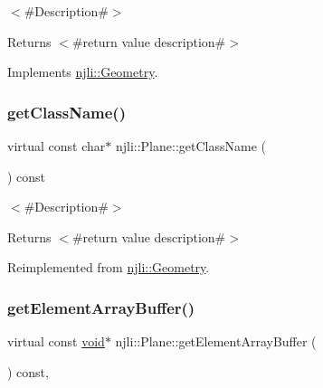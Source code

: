 $<$\#\+Description\#$>$

\begin{DoxyReturn}{Returns}
$<$\#return value description\#$>$ 
\end{DoxyReturn}


Implements \mbox{\hyperlink{classnjli_1_1_geometry_a97ec03852997043d6900af8009b390d9}{njli\+::\+Geometry}}.

\mbox{\label{classnjli_1_1_plane_a9a7ccbc86c1f486cd816f0f4f3e9c550}} 
\subsubsection{\texorpdfstring{get\+Class\+Name()}{getClassName()}}
{\footnotesize\ttfamily virtual const char$\ast$ njli\+::\+Plane\+::get\+Class\+Name (\begin{DoxyParamCaption}{ }\end{DoxyParamCaption}) const\hspace{0.3cm}{\ttfamily [virtual]}}

$<$\#\+Description\#$>$

\begin{DoxyReturn}{Returns}
$<$\#return value description\#$>$ 
\end{DoxyReturn}


Reimplemented from \mbox{\hyperlink{classnjli_1_1_geometry_abfa3fe3b5680b7b40c650fdc7a7fb737}{njli\+::\+Geometry}}.

\mbox{\label{classnjli_1_1_plane_a13ae025d91ca2ef639d1ba4e92b5ccc5}} 
\subsubsection{\texorpdfstring{get\+Element\+Array\+Buffer()}{getElementArrayBuffer()}}
{\footnotesize\ttfamily virtual const \mbox{\hyperlink{_thread_8h_af1e856da2e658414cb2456cb6f7ebc66}{void}}$\ast$ njli\+::\+Plane\+::get\+Element\+Array\+Buffer (\begin{DoxyParamCaption}{ }\end{DoxyParamCaption}) const\hspace{0.3cm}{\ttfamily [protected]}, {\ttfamily [virtual]}}

